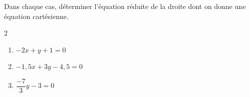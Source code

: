 \begin{exo}{}
	Dans chaque cas, déterminer l'équation réduite de la droite dont on donne une équation cartésienne.
	\vspace*{-2mm}\begin{multicols}{2}
		\begin{enumerate}
			\item $-2x + y + 1 = 0$
			\item $-1,5x + 3y - 4,5 = 0$
			\item $\dfrac{-7}{3}y - 3 = 0$
		\end{enumerate}
	\end{multicols}
\end{exo}
